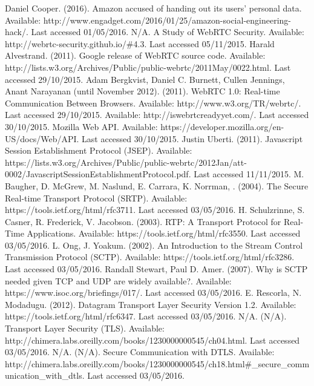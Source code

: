 \documentclass[]{report}
\begin{document}
\begin{thebibliography}{20}
		Daniel Cooper. (2016). Amazon accused of handing out its users' personal data. Available: http://www.engadget.com/2016/01/25/amazon-social-engineering-hack/. Last accessed 01/05/2016.
		N/A. A Study of WebRTC Security. Available: http://webrtc-security.github.io/\#4.3. Last accessed 05/11/2015.
		Harald Alvestrand. (2011). Google release of WebRTC source code. Available: http://lists.w3.org/Archives/Public/public-webrtc/2011May/0022.html. Last accessed 29/10/2015.
		Adam Bergkvist, Daniel C. Burnett, Cullen Jennings, Anant Narayanan (until November 2012). (2011). WebRTC 1.0: Real-time Communication Between Browsers. Available: http://www.w3.org/TR/webrtc/. Last accessed 29/10/2015.
		Available: http://iswebrtcreadyyet.com/. Last accessed 30/10/2015.
		Mozilla Web API. Available: https://developer.mozilla.org/en-US/docs/Web/API. Last accessed 30/10/2015.
		Justin Uberti. (2011). Javascript Session Establishment Protocol (JSEP). Available: https://lists.w3.org/Archives/Public/public-webrtc/2012Jan/att-0002/JavascriptSessionEstablishmentProtocol.pdf. Last accessed 11/11/2015.
		M. Baugher, D. McGrew, M. Naslund, E. Carrara, K. Norrman, . (2004). The Secure Real-time Transport Protocol (SRTP). Available: https://tools.ietf.org/html/rfc3711. Last accessed 03/05/2016.
		H. Schulzrinne, S. Casner, R. Frederick, V. Jacobson. (2003). RTP: A Transport Protocol for Real-Time Applications. Available: https://tools.ietf.org/html/rfc3550. Last accessed 03/05/2016.
		L. Ong, J. Yoakum. (2002). An Introduction to the Stream Control Transmission Protocol (SCTP). Available: https://tools.ietf.org/html/rfc3286. Last accessed 03/05/2016.
		Randall Stewart, Paul D. Amer. (2007). Why is SCTP needed given TCP and UDP are widely available?. Available: https://www.isoc.org/briefings/017/. Last accessed 03/05/2016.
		E. Rescorla, N. Modadugu. (2012). Datagram Transport Layer Security Version 1.2. Available: https://tools.ietf.org/html/rfc6347. Last accessed 03/05/2016.
		N/A. (N/A). Transport Layer Security (TLS). Available: http://chimera.labs.oreilly.com/books/1230000000545/ch04.html. Last accessed 03/05/2016.
		N/A. (N/A). Secure Communication with DTLS. Available: http://chimera.labs.oreilly.com/books/1230000000545/ch18.html\#\_secure\_communication\_with\_dtls. Last accessed 03/05/2016.

\end{thebibliography}
\end{document}
